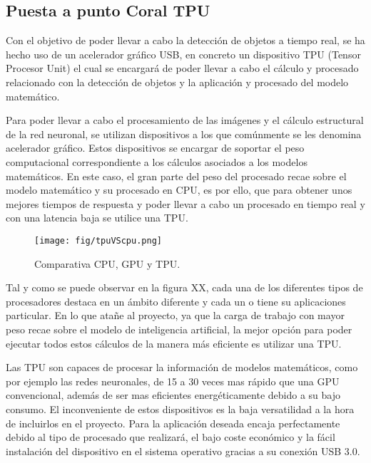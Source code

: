 
\subsection{Puesta a punto Coral TPU}

Con el objetivo de poder llevar a cabo la detección de objetos a tiempo real, se ha hecho uso de un acelerador gráfico USB, en concreto un dispositivo TPU (Tensor Procesor Unit) el cual se encargará de poder llevar a cabo el cálculo y procesado relacionado con la detección de objetos y la aplicación y procesado del modelo matemático.

Para poder llevar a cabo el procesamiento de las imágenes y el cálculo estructural de la red neuronal, se utilizan dispositivos a los que comúnmente se les denomina acelerador gráfico. Estos dispositivos se encargar de soportar el peso computacional correspondiente a los cálculos asociados a los modelos matemáticos. En este caso, el gran parte del peso del procesado recae sobre el modelo matemático y su procesado en CPU, es por ello, que para obtener unos mejores tiempos de respuesta y poder llevar a cabo un procesado en tiempo real y con una latencia baja se utilice una TPU.

\begin{figure}[h]
    \centering
    \texttt{[image: fig/tpuVScpu.png]}
    \caption{Comparativa CPU, GPU y TPU.}
    \label{fig:mesh1}
\end{figure}

Tal y como se puede observar en la figura XX, cada una de los diferentes tipos de procesadores destaca en un ámbito diferente y cada un o tiene su aplicaciones particular. En lo que atañe al proyecto, ya que la carga de trabajo con mayor peso recae sobre el modelo de inteligencia artificial, la mejor opción para poder ejecutar todos estos cálculos de la manera más eficiente es utilizar una TPU.

Las TPU son capaces de procesar la información de modelos matemáticos, como por ejemplo las redes neuronales, de 15 a 30 veces mas rápido que una GPU convencional, además de ser mas eficientes energéticamente debido a su bajo consumo. El inconveniente de estos dispositivos es la baja versatilidad a la hora de incluirlos en el proyecto. Para la aplicación deseada encaja perfectamente debido al tipo de procesado que realizará, el bajo coste económico y la fácil instalación del dispositivo en el sistema operativo gracias a su conexión USB 3.0. 


